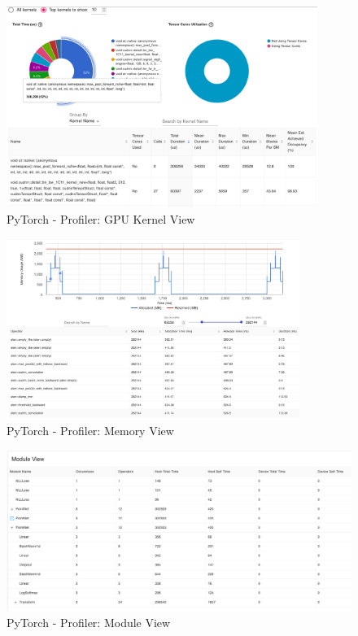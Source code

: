 \documentclass[12pt, a4paper, hidelinks]{article}
\begin{document}
\begin{figure}[H]
\centering
\includegraphics[width=0.9\textwidth]{./assets/scap_gtx1080_profiler-torch_batch-size-64_14650758_gpu-kernel-view}
\caption[PyTorch - Profiler: GPU Kernel View]{PyTorch - Profiler: GPU Kernel View}
\label{fig:scap_gtx1080_profiler-torch_batch-size-64_14650758_gpu-kernel-view}
\end{figure}

\begin{figure}[H]
\centering
\includegraphics[width=0.85\textwidth]{./assets/scap_gtx1080_profiler-torch_batch-size-64_14650758_memory-view}
\caption[PyTorch - Profiler: Memory View]{PyTorch - Profiler: Memory View}
\label{fig:scap_gtx1080_profiler-torch_batch-size-64_14650758_memory-view}
\end{figure}

\begin{figure}[H]
\centering
\includegraphics[width=1\textwidth]{./assets/scap_gtx1080_profiler-torch_batch-size-64_14650758_module-view}
\caption[PyTorch - Profiler: Module View]{PyTorch - Profiler: Module View}
\label{fig:scap_gtx1080_profiler-torch_batch-size-64_14650758_module-view}
\end{figure}
\end{document}
